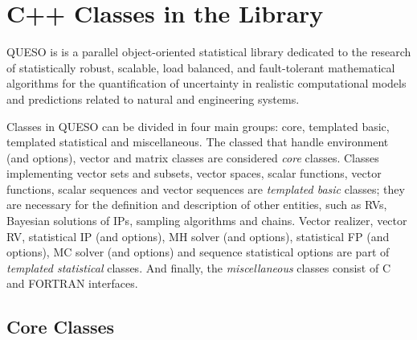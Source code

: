 \chapter{C++ Classes in the Library}\label{ch-classes}
\thispagestyle{headings}



QUESO is is a parallel object-oriented statistical library dedicated to the research of   statistically robust, scalable, load balanced, and fault-tolerant mathematical algorithms for the  quantification of uncertainty in realistic computational models and predictions related to natural and engineering systems.



Classes in QUESO can be divided in four main groups: core, templated basic, templated statistical and miscellaneous.
The classed that handle environment (and options), vector and matrix classes are considered \textit{core} classes. Classes implementing vector sets and subsets, vector spaces,  scalar functions, vector functions, scalar sequences and vector sequences are \textit{templated basic} classes; they are necessary for the definition and description of other entities, such as RVs, Bayesian solutions of IPs, sampling algorithms and chains.  Vector realizer, vector RV, statistical IP (and options), MH solver (and options), statistical FP (and options), MC solver (and options) and sequence statistical options are part of \textit{templated statistical} classes. And finally, the \textit{miscellaneous} classes consist of C and FORTRAN interfaces.





\section{Core Classes}


